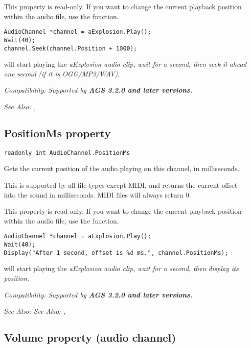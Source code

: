 This property is read-only. If you want to change the current playback position within the audio file,
use the  function.

\begin{verbatim}
AudioChannel *channel = aExplosion.Play();
Wait(40);
channel.Seek(channel.Position + 1000);
\end{verbatim}
will start playing the \it{aExplosion} audio clip, wait for a second, then seek it ahead one second (if it is OGG/MP3/WAV).

\it{Compatibility:} Supported by \bf{AGS 3.2.0} and later versions.

\it{See Also:} ,


\subsection{PositionMs property}\label{AudioChannel.PositionMs}%

\begin{verbatim}
readonly int AudioChannel.PositionMs
\end{verbatim}
Gets the current position of the audio playing on this channel, in milliseconds.

This is supported by all file types except MIDI, and returns the current offset into the sound
in milliseconds. MIDI files will always return 0.

This property is read-only. If you want to change the current playback position within the audio file,
use the  function.

\begin{verbatim}
AudioChannel *channel = aExplosion.Play();
Wait(40);
Display("After 1 second, offset is %d ms.", channel.PositionMs);
\end{verbatim}
will start playing the \it{aExplosion} audio clip, wait for a second, then display its position.

\it{Compatibility:} Supported by \bf{AGS 3.2.0} and later versions.

\it{See Also:} \it{See Also:} ,


\subsection{Volume property (audio channel)}\label{AudioChannel.Volume}%

